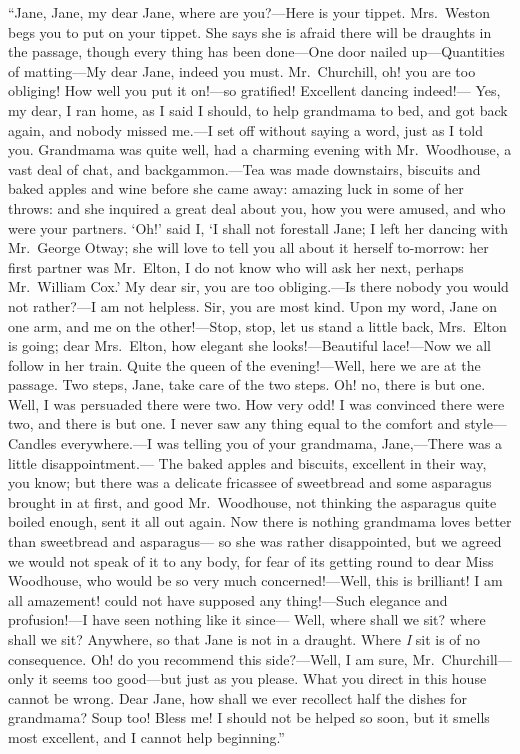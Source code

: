 ``Jane, Jane, my dear Jane, where are you?---Here is your tippet.
Mrs.\ Weston begs you to put on your tippet.  She says she is afraid
there will be draughts in the passage, though every thing has
been done---One door nailed up---Quantities of matting---My dear Jane,
indeed you must.  Mr.\ Churchill, oh! you are too obliging!
How well you put it on!---so gratified!  Excellent dancing indeed!---%
Yes, my dear, I ran home, as I said I should, to help grandmama
to bed, and got back again, and nobody missed me.---I set off without
saying a word, just as I told you.  Grandmama was quite well,
had a charming evening with Mr.\ Woodhouse, a vast deal of chat,
and backgammon.---Tea was made downstairs, biscuits and baked apples
and wine before she came away:  amazing luck in some of her throws:
and she inquired a great deal about you, how you were amused,
and who were your partners.  `Oh!' said I, `I shall not forestall Jane;
I left her dancing with Mr.\ George Otway; she will love to tell you
all about it herself to-morrow: her first partner was Mr.\ Elton,
I do not know who will ask her next, perhaps Mr.\ William Cox.'
My dear sir, you are too obliging.---Is there nobody you would
not rather?---I am not helpless.  Sir, you are most kind.  Upon my word,
Jane on one arm, and me on the other!---Stop, stop, let us stand
a little back, Mrs.\ Elton is going; dear Mrs.\ Elton, how elegant
she looks!---Beautiful lace!---Now we all follow in her train.
Quite the queen of the evening!---Well, here we are at the passage.
Two steps, Jane, take care of the two steps.  Oh! no, there is
but one.  Well, I was persuaded there were two.  How very odd!
I was convinced there were two, and there is but one.  I never saw any
thing equal to the comfort and style---Candles everywhere.---I was telling
you of your grandmama, Jane,---There was a little disappointment.---%
The baked apples and biscuits, excellent in their way, you know;
but there was a delicate fricassee of sweetbread and some asparagus
brought in at first, and good Mr.\ Woodhouse, not thinking the
asparagus quite boiled enough, sent it all out again.  Now there
is nothing grandmama loves better than sweetbread and asparagus---%
so she was rather disappointed, but we agreed we would not speak of it
to any body, for fear of its getting round to dear Miss Woodhouse,
who would be so very much concerned!---Well, this is brilliant!
I am all amazement! could not have supposed any thing!---Such
elegance and profusion!---I have seen nothing like it since---%
Well, where shall we sit? where shall we sit?  Anywhere, so that
Jane is not in a draught.  Where \emph{I} sit is of no consequence.
Oh! do you recommend this side?---Well, I am sure, Mr.\ Churchill---%
only it seems too good---but just as you please.  What you direct
in this house cannot be wrong.  Dear Jane, how shall we ever
recollect half the dishes for grandmama?  Soup too!  Bless me!
I should not be helped so soon, but it smells most excellent, and I
cannot help beginning.''

